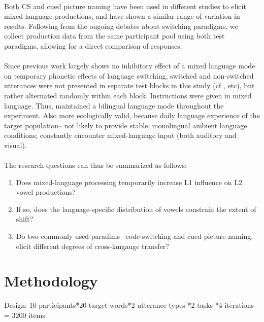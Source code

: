 \documentclass[11pt]{article}
\begin{document}
\paragraph{}Both CS and cued picture naming have been used in different studies to elicit mixed-language productions, and have shown a similar range of variation in results. Following from the ongoing debates about  switching paradigms, we collect production data from the same participant pool using both test paradigms, allowing for a direct comparison of responses. 

\paragraph{}Since previous work largely shows no inhibitory effect of a mixed language mode on temporary phonetic effects of language switching, switched and non-switched utterances were not presented in separate test blocks in this study (cf , etc), but rather alternated randomly within each block. Instructions were given in mixed language. Thus, maintained a bilingual language mode throughout the experiment. Also more ecologically valid, because daily language experience of the target population-- not likely to provide stable, monolingual ambient language conditions; constantly encounter mixed-language input (both auditory and visual).

\paragraph{}The research questions can thus be summarized as follows:
\begin{enumerate}[label=(\roman*)]
	\item Does mixed-language processing temporarily increase L1 influence on L2 vowel productions?
	\item If so, does the language-specific distribution of vowels constrain the extent of shift?
	\item Do two commonly used paradims-- code-switching and cued picture-naming, elicit different degrees of cross-langauge transfer?
\end{enumerate}

\section{Methodology} %
Design: 10 participants*20 target words*2 utterance types *2 tasks *4 iterations = 3200 items
\end{document}
